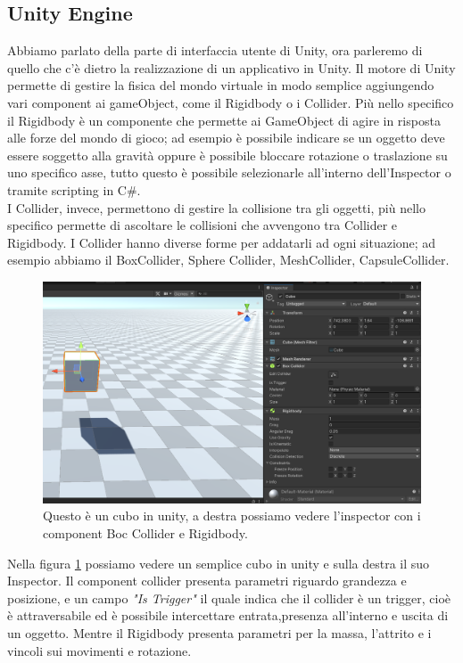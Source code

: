 \documentclass[12pt, openany]{book}
\begin{document}
	\subsection{Unity Engine}
	Abbiamo parlato della parte di interfaccia utente di Unity, ora parleremo di quello che c'è dietro la realizzazione di un applicativo in Unity.
	Il motore di Unity permette di gestire la fisica del mondo virtuale in modo semplice aggiungendo vari component ai gameObject, come il Rigidbody o i Collider. Più nello specifico il Rigidbody è un componente che permette ai GameObject di agire in risposta alle forze del mondo di gioco; ad esempio è possibile indicare se un oggetto deve essere soggetto alla gravità oppure è possibile bloccare rotazione o traslazione su uno specifico asse, tutto questo è possibile selezionarle all'interno dell'Inspector o tramite scripting in C\#.\\
	I Collider, invece, permettono di gestire la collisione tra gli oggetti, più nello specifico permette di ascoltare le collisioni che avvengono tra Collider e Rigidbody. I Collider hanno diverse forme per addatarli ad ogni situazione; ad esempio abbiamo il BoxCollider, Sphere Collider, MeshCollider, CapsuleCollider.
	\begin{figure}[H]
		\centering
		\includegraphics[width=0.8\linewidth]{"Immagini/RigidBody.png"}
		\caption{Questo è un cubo in unity, a destra possiamo vedere l'inspector con i component Boc Collider e Rigidbody.}
		\label{fig:Rigidbody}
	\end{figure}
	Nella figura \ref{fig:Rigidbody} possiamo vedere un semplice cubo in unity e sulla destra il suo Inspector. Il component collider presenta parametri riguardo grandezza e posizione, e un campo \emph{"Is Trigger"} il quale indica che il collider è un trigger, cioè è attraversabile ed è possibile intercettare entrata,presenza all'interno e uscita di un oggetto. Mentre il Rigidbody presenta parametri per la massa, l'attrito e i vincoli sui movimenti e rotazione.
\end{document}
